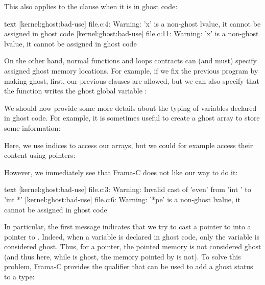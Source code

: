 This also applies to the  clause when it is
in ghost code:




\begin{CodeBlock}{text}
[kernel:ghost:bad-use] file.c:4: Warning:
  'x' is a non-ghost lvalue, it cannot be assigned in ghost code
[kernel:ghost:bad-use] file.c:11: Warning:
  'x' is a non-ghost lvalue, it cannot be assigned in ghost code
\end{CodeBlock}


On the other hand, normal functions and loops contracts can (and
must) specify assigned ghost memory locations. For example, if we
fix the previous program by making  ghost, first, our
previous  clauses are allowed, but we can also
specify that the function  writes the ghost global
variable :






We should now provide some more details about the typing of variables
declared in ghost code. For example, it is sometimes useful to create
a ghost array to store some information:




Here, we use indices to access our arrays, but we could for example
access their content using pointers:




However, we immediately see that Frama-C does not like our way to do it:


\begin{CodeBlock}{text}
[kernel:ghost:bad-use] file.c:3: Warning:
  Invalid cast of 'even' from 'int \ghost *' to 'int *'
[kernel:ghost:bad-use] file.c:6: Warning:
  '*pe' is a non-ghost lvalue, it cannot be assigned in ghost code
\end{CodeBlock}


In particular, the first message indicates that we try to cast
a pointer to  into a pointer
to . Indeed, when a variable is declared in ghost
code, only the variable is considered ghost. Thus, for a pointer,
the pointed memory is not considered ghost (and thus here, while
 is ghost, the memory pointed by  is
not). To solve this problem, Frama-C provides the
 qualifier that can be used to
add a ghost status to a type:


